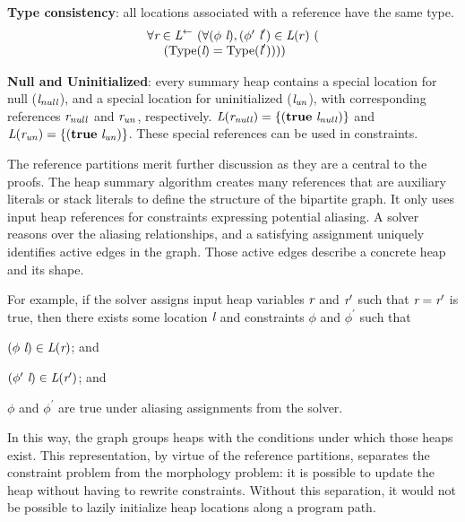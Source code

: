 \textbf{Type consistency}: all locations associated with a reference have the same type.
\[
\begin{array}{l}
\forall \cfgnt{r} \in \cfgnt{L}^\leftarrow\ (\forall (\phi\ \cfgnt{l}),(\phi^\prime\ \cfgnt{l}^\prime) \in \cfgnt{L}(r)\ (\\
\ \ \ \ (\mathrm{Type}\lp\cfgnt{l}\rp = \mathrm{Type}\lp\cfgnt{l}^\prime\rp)))
\end{array}
\]

\textbf{Null and Uninitialized}: every summary heap contains 
a special location for null ($\emph{l}_\mathit{null}$), and a special
location for uninitialized
  ($\emph{l}_\mathit{un}$), with corresponding references
  $\emph{r}_\mathit{null}$ and
  $\emph{r}_\mathit{un}$, respectively. $\emph{L}(\emph{r}_\mathit{null}) =
  \{(\textbf{true}\ \emph{l}_\mathit{null})\}$ and
  $\emph{L}(\emph{r}_\mathit{un}) =
  \{(\textbf{true}\ \emph{l}_\mathit{un})\}$. These special references can be used in constraints.

The reference partitions merit further discussion as they are a
central to the proofs. The heap summary algorithm creates
many references that are auxiliary literals or stack literals to
define the structure of the bipartite graph.  It only uses input heap
references for constraints expressing potential aliasing. A solver
reasons over the aliasing relationships, and a satisfying assignment
uniquely identifies active edges in the graph. Those active edges
describe a concrete heap and its shape.

For example, if the solver assigns input heap variables $\emph{r}$ and $\emph{r}^\prime$
such that $\emph{r} = \emph{r}^\prime$ is true, then there exists
some location $\emph{l}$ and constraints $\phi$ and $\phi^\prime$ such
that
\begin{compactitem}
\item $(\phi\ \emph{l}) \in \emph{L}(\emph{r})$; and
\item $(\phi^\prime\ \emph{l}) \in \emph{L}(\emph{r}^\prime)$; and
\item $\phi$ and $\phi^\prime$ are true under aliasing assignments from the solver.
\end{compactitem}
In this way, the graph groups heaps with the conditions under which
those heaps exist. This representation, by virtue of the reference
partitions, separates the constraint problem from the morphology
problem: it is possible to update the heap without having to rewrite
constraints. Without this separation, it would not be possible to
lazily initialize heap locations along a program path.

